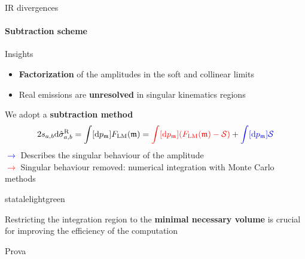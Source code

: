 
\begin{frame} {IR divergences}
 \framesubtitle{Subtraction scheme}
Insights \\
\begin{itemize}
    \item \textbf{Factorization} of the amplitudes in the soft and collinear limits 
    \item Real emissions are \textbf{unresolved} in singular kinematics regions
\end{itemize}
 \vspace{1.em}
 We adopt a \textbf{subtraction method}
\begin{equation*}
    2s_{a,b} \mathrm{d} \hat{\sigma}_{a,b}^{\mathrm{R}} = \int [\mathrm{d}p_{\mathfrak{m}}] F_{\mathrm{LM}} (\mathfrak{m})=  \textcolor{red}{\int [\mathrm{d}p_{\mathfrak{m}}] (F_{\mathrm{LM}}(\mathfrak{m}) - \mathcal{S})}  + \textcolor{blue}{\int [\mathrm{d}p_{\mathfrak{m}}] \mathcal{S}}
    \label{subtraction-flm}
\end{equation*}
\textcolor{blue}{$\to$} Describes the singular behaviour of the amplitude\\ 
\textcolor{red}{$\to$} Singular behaviour removed: numerical integration with Monte Carlo methods \\


\begin{colorblock}[black]{statalelightgreen}{}
\begin{center}
    Restricting the integration region to the \textbf{minimal necessary volume} is crucial for improving the efficiency of the computation
\end{center}
            
      \end{colorblock}

      Prova


\end{frame}

